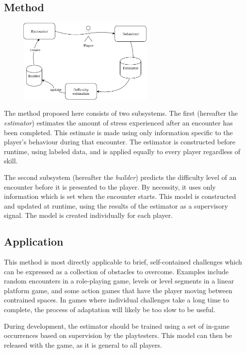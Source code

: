 \documentclass[a4paper]{article}
\begin{document}
\begin{multicols*}{2}
\section{Method}
\begin{figure}[t]
\centering
\includegraphics[width=0.60\textwidth]{processflowchart}
\end{figure}

The method proposed here consists of two subsystems. The first (hereafter the \emph{estimator}) estimates the amount of stress experienced after an encounter has been completed. This estimate is made using only information specific to the player's behaviour during that encounter. The estimator is constructed before runtime, using labeled data, and is applied equally to every player regardless of skill.

The second subsystem (hereafter the \emph{builder}) predicts the difficulty level of an encounter before it is presented to the player. By necessity, it uses only information which is set when the encounter starts. This model is constructed and updated at runtime, using the results of the estimator as a supervisory signal. The model is created individually for each player.

\subsection{Application}
This method is most directly applicable to brief, self-contained challenges which can be expressed as a collection of obstacles to overcome. Examples include random encounters in a role-playing game, levels or level segments in a linear platform game, and some action games that have the player moving between contrained spaces. In games where individual challenges take a long time to complete, the process of adaptation will likely be too slow to be useful.

During development, the estimator should be trained using a set of in-game occurrences based on supervision by the playtesters. This model can then be released with the game, as it is general to all players. 


\end{multicols*}
\end{document}
